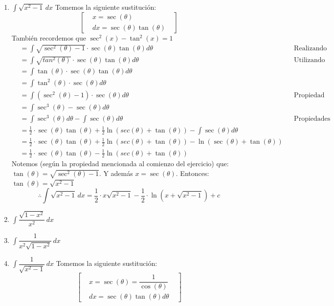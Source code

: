 \documentclass[letterpaper]{article}
\renewcommand{\*}{\cdot}
\theoremstyle{definition}
\begin{document}
\begin{enumerate}
\begin{enumerate}
\item$\displaystyle \int \sqrt{x^2 - 1} \, dx$
Tomemos la siguiente sustitución:
\[  \begin{bmatrix}
& x = \sec(\theta) &\\
&dx = \sec(\theta)\tan(\theta)&
\end{bmatrix} \]
También recordemos que $\sec^{2}(x)-\tan^{2}(x)=1$
\begin{align*}
	&= \int \sqrt{\sec^{2}(\theta)-1}\cdot \sec(\theta)\tan(\theta)d\theta &&\text{Realizando la sustitución}\\
	&= \int \sqrt{tan^{2}(\theta)} \cdot \sec(\theta)\tan(\theta)d\theta &&\text{Utilizando la propiedad mencionada}\\
	&= \int \tan(\theta) \cdot \sec(\theta)\tan(\theta)d\theta \\
	&= \int \tan^{2}(\theta)\cdot \sec(\theta) d\theta\\
	&= \int (\sec^{2}(\theta)-1)\cdot \sec(\theta) d\theta &&\text{Propiedad anterior}\\
	&=\int \sec^{3}(\theta)-\sec(\theta)d\theta \\
	&= \int \sec^{3}(\theta)d\theta-\int \sec(\theta)d\theta &&\text{Propiedades de la integral}\\
	&= \frac{1}{2}\cdot \sec(\theta)\tan(\theta)+\frac{1}{2}\ln(sec(\theta)+\tan(\theta))-\int \sec(\theta)d\theta\\
	&=\frac{1}{2}\cdot \sec(\theta)\tan(\theta)+\frac{1}{2}\ln(sec(\theta)+\tan(\theta)) - \ln(\sec(\theta)+\tan(\theta))\\
	&=\frac{1}{2}\cdot \sec(\theta)\tan(\theta)-\frac{1}{2}\ln(sec(\theta)+\tan(\theta))
\end{align*}
Notemos (según la propiedad mencionada al comienzo del ejercicio) que: $\tan(\theta)= \sqrt{\sec^{2}(\theta)-1}$. Y además $x = \sec(\theta)$. Entonces: $\tan(\theta)=\sqrt{x^{2}-1}$
\[\therefore \int \sqrt{x^2 - 1} \, dx= \frac{1}{2}\cdot x\sqrt{x^{2}-1}-\frac{1}{2}\cdot\ln(x+\sqrt{x^{2}-1})+c\]
\item$\displaystyle \int \dfrac{\sqrt{1 - x^2}}{x^2} \, dx$
\item$\displaystyle \int  \dfrac{1}{x^2 \sqrt{1 - x^2}} \, dx$
\item$\displaystyle \int  \dfrac{1}{ \sqrt{x^2 - 1}} \, dx$
Tomemos la siguiente sustitución:
\[  \begin{bmatrix}
& x = \sec(\theta)= \dfrac{1}{\cos(\theta)} &\\
&dx = \sec(\theta)\tan(\theta)d\theta&
\end{bmatrix} \]

\end{enumerate}
\end{enumerate}
\end{document}
